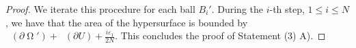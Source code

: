 \documentclass[12pt]{amsart}
\newtheorem{lemma}[theorem]{Lemma}
\DeclareMathOperator{\Hn}{\mathcal{H}^n}
\DeclareMathOperator{\G}{\Gamma}
\DeclareMathOperator{\Om}{\Omega}
\DeclareMathOperator{\Si}{\Sigma}
\theoremstyle{definition}
\begin{document}
\begin{proof}


We iterate this procedure for each ball $B_i'$.
During the $i$-th step, $1 \leq i \leq N$, we have that 
the area of the hypersurface is bounded by
$\Hn(\partial \Om')+ \Hn(\partial U) + \frac{i \varepsilon_1}{2N}$.
This concludes the proof of  Statement (3) A).
\end{proof}



	
\end{document}
